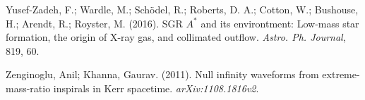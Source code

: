 Yusef-Zadeh, F.; Wardle, M.; Sch\"{o}del, R.; Roberts, D. A.; Cotton, W.; Bushouse, H.; Arendt, R.; Royster, M. (2016). SGR $A^*$ and its environtment: Low-mass star formation, the origin of X-ray gas, and collimated outflow. {\em Astro. Ph. Journal}, 819, 60.

Zenginoglu, Anil; Khanna, Gaurav. (2011). Null infinity waveforms from extreme-mass-ratio inspirals in Kerr spacetime. {\em arXiv:1108.1816v2}.























